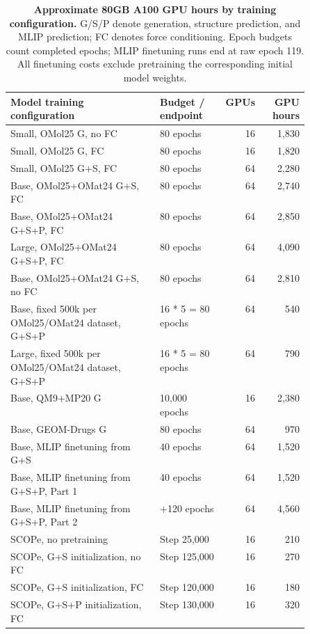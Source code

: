 \documentclass{article} %
\begin{document}
\begin{table}[htbp]
  \centering
  \small
  \caption{\textbf{Approximate 80GB A100 GPU hours by training configuration.}
  G/S/P denote generation, structure prediction, and MLIP prediction; FC denotes
  force conditioning. Epoch budgets count completed epochs;
  MLIP finetuning runs end at raw epoch 119. All finetuning costs exclude pretraining the corresponding initial model weights.}
  \label{tab:zatom2-compute}
  \vspace{0.4em}
  \begin{tabular}{@{}p{0.50\linewidth}lrr@{}}
    \toprule
    Model training configuration & Budget / endpoint & GPUs & GPU hours \\
    \midrule
    Small, OMol25 G, no FC & 80 epochs & 16 & 1,830 \\
    Small, OMol25 G, FC & 80 epochs & 16 & 1,820 \\
    Small, OMol25 G+S, FC & 80 epochs & 64 & 2,280 \\
    Base, OMol25+OMat24 G+S, FC & 80 epochs & 64 & 2,740 \\
    Base, OMol25+OMat24 G+S+P, FC & 80 epochs & 64 & 2,850 \\
    Large, OMol25+OMat24 G+S+P, FC & 80 epochs & 64 & 4,090 \\
    Base, OMol25+OMat24 G+S, no FC & 80 epochs & 64 & 2,810 \\
    Base, fixed 500k per OMol25/OMat24 dataset, G+S+P & 16 * 5 = 80 epochs & 64 & 540 \\
    Large, fixed 500k per OMol25/OMat24 dataset, G+S+P & 16 * 5 = 80 epochs & 64 & 790 \\
    Base, QM9+MP20 G & 10,000 epochs & 16 & 2,380 \\
    Base, GEOM-Drugs G & 80 epochs & 64 & 970 \\
    \midrule
    Base, MLIP finetuning from G+S & 40 epochs & 64 & 1,520 \\
    Base, MLIP finetuning from G+S+P, Part 1 & 40 epochs & 64 & 1,520 \\
    Base, MLIP finetuning from G+S+P, Part 2 & +120 epochs & 64 & 4,560 \\
    \midrule
    SCOPe, no pretraining & Step 25,000 & 16 & 210 \\
    SCOPe, G+S initialization, no FC & Step 125,000 & 16 & 270 \\
    SCOPe, G+S initialization, FC & Step 120,000 & 16 & 180 \\
    SCOPe, G+S+P initialization, FC & Step 130,000 & 16 & 320 \\
    \bottomrule
  \end{tabular}
\end{table}
\end{document}
